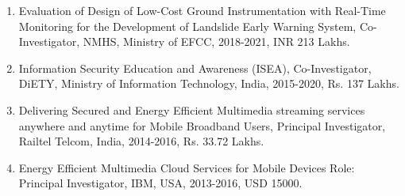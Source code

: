 \begin{enumerate}

\item Evaluation of Design of Low-Cost Ground Instrumentation with Real-Time Monitoring for the Development of Landslide Early Warning System, Co-Investigator, NMHS, Ministry of EFCC, 2018-2021, INR 213 Lakhs.

\item Information Security Education and Awareness (ISEA), Co-Investigator, DiETY, Ministry of Information Technology, India, 2015-2020, Rs. 137 Lakhs. 

\item Delivering Secured and Energy Efficient Multimedia streaming services anywhere and anytime for Mobile Broadband Users, Principal Investigator, Railtel Telcom, India, 2014-2016, Rs. 33.72 Lakhs. 

\item Energy Efficient Multimedia Cloud Services for Mobile Devices 
Role: Principal Investigator, IBM, USA, 2013-2016, USD 15000.

\end{enumerate}